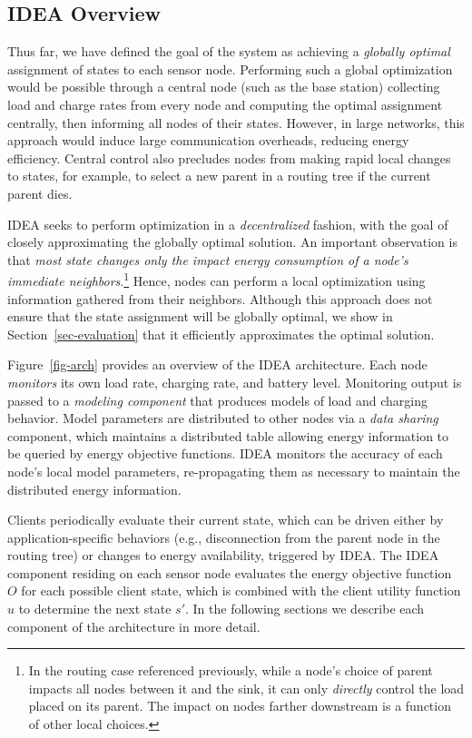 \subsection{IDEA Overview}

Thus far, we have defined the goal of the system as achieving a
\textit{globally optimal} assignment of states to each sensor node.
Performing such a global optimization would be possible through a central
node (such as the base station) collecting load and charge rates from every
node and computing the optimal assignment centrally, then informing all nodes
of their states. However, in large networks, this approach would induce large
communication overheads, reducing energy efficiency. Central control also
precludes nodes from making rapid local changes to states, for example, to
select a new parent in a routing tree if the current parent dies.

IDEA seeks to perform optimization in a \textit{decentralized} fashion, with
the goal of closely approximating the globally optimal solution. An important
observation is that \textit{most state changes only the impact energy
consumption of a node's immediate neighbors}.\footnote{In the routing case
referenced previously, while a node's choice of parent impacts all nodes
between it and the sink, it can only \textit{directly} control the load
placed on its parent. The impact on nodes farther downstream is a function of
other local choices.} Hence, nodes can perform a local optimization using
information gathered from their neighbors. Although this approach does not
ensure that the state assignment will be globally optimal, we show in
Section~\ref{sec-evaluation} that it efficiently approximates the optimal
solution.

Figure~\ref{fig-arch} provides an overview of the IDEA architecture. Each
node \textit{monitors} its own load rate, charging rate, and battery level.
Monitoring output is passed to a \textit{modeling component} that produces
models of load and charging behavior. Model parameters are distributed to
other nodes via a \textit{data sharing} component, which maintains a
distributed table allowing energy information to be queried by energy
objective functions. IDEA monitors the accuracy of each node's local model
parameters, re-propagating them as necessary to maintain the distributed
energy information.

Clients periodically evaluate their current state, which can be driven either
by application-specific behaviors (e.g., disconnection from the parent node
in the routing tree) or changes to energy availability, triggered by IDEA.
The IDEA component residing on each sensor node evaluates the energy
objective function $O$ for each possible client state, which is combined with
the client utility function $u$ to determine the next state $s'$. In the
following sections we describe each component of the architecture in more
detail.

